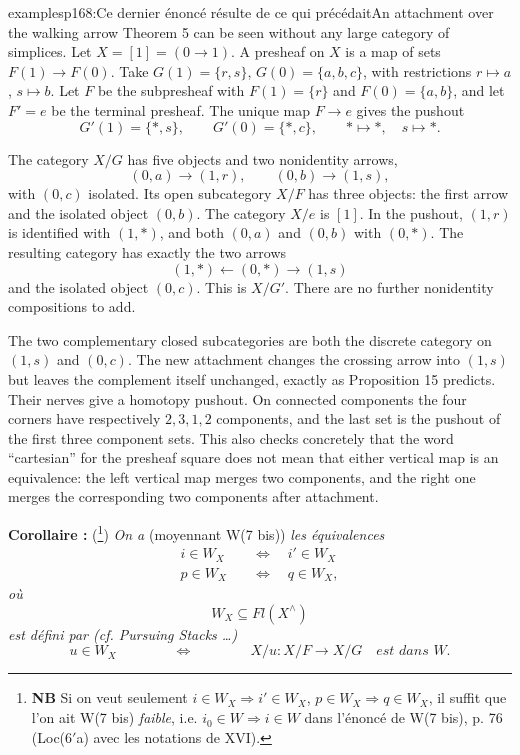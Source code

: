 \begin{dcomment}{examples}{p168:Ce dernier énoncé résulte de ce qui précédait}{An attachment over the walking arrow}
Theorem 5 can be seen without any large category of simplices. Let $X=[1]=(0\to1)$. A presheaf on $X$ is a map of sets $F(1)\to F(0)$. Take $G(1)=\{r,s\}$, $G(0)=\{a,b,c\}$, with restrictions $r\mapsto a$, $s\mapsto b$. Let $F$ be the subpresheaf with $F(1)=\{r\}$ and $F(0)=\{a,b\}$, and let $F'=e$ be the terminal presheaf. The unique map $F\to e$ gives the pushout
\[
 G'(1)=\{*,s\},\qquad G'(0)=\{*,c\},
 \qquad *\mapsto*,\quad s\mapsto*.
\]

The category $X/G$ has five objects and two nonidentity arrows,
\[
 (0,a)\longrightarrow(1,r),\qquad
 (0,b)\longrightarrow(1,s),
\]
with $(0,c)$ isolated. Its open subcategory $X/F$ has three objects: the first arrow and the isolated object $(0,b)$. The category $X/e$ is $[1]$. In the pushout, $(1,r)$ is identified with $(1,*)$, and both $(0,a)$ and $(0,b)$ with $(0,*)$. The resulting category has exactly the two arrows
\[
 (1,*)\longleftarrow(0,*)\longrightarrow(1,s)
\]
and the isolated object $(0,c)$. This is $X/G'$. There are no further nonidentity compositions to add.

The two complementary closed subcategories are both the discrete category on $(1,s)$ and $(0,c)$. The new attachment changes the crossing arrow into $(1,s)$ but leaves the complement itself unchanged, exactly as Proposition 15 predicts. Their nerves give a homotopy pushout. On connected components the four corners have respectively $2,3,1,2$ components, and the last set is the pushout of the first three component sets. This also checks concretely that the word ``cartesian'' for the presheaf square does not mean that either vertical map is an equivalence: the left vertical map merges two components, and the right one merges the corresponding two components after attachment.
\end{dcomment}


\textbf{Corollaire :} (\footnote[111]{\textbf{NB} Si on veut seulement $i \in W_X \Longrightarrow i' \in W_X$, $p \in W_X \Longrightarrow q \in W_X$, il suffit que l’on ait W(7 bis) \textit{faible}, i.e. $i_0 \in W \Longrightarrow i \in W$ dans l’énoncé de W(7 bis), p. 76 (Loc(6$'$a) avec les notations de XVI).}) \textit{On a} (moyennant W(7 bis)) \textit{les équivalences}
\[
\begin{aligned}
i \in W_X \quad &\Longleftrightarrow \quad i' \in W_X \\
p \in W_X \quad &\Longleftrightarrow \quad q \in W_X,
\end{aligned}
\]
\textit{où}
\[
W_X \subseteq \mathit{Fl}(X^\wedge)
\]
\textit{est défini par (cf. Pursuing Stacks \ldots)}
\[
u \in W_X \qquad\qquad \Longleftrightarrow \qquad\qquad X/u : X/F \longrightarrow X/G \quad \textit{est dans } W.
\]

